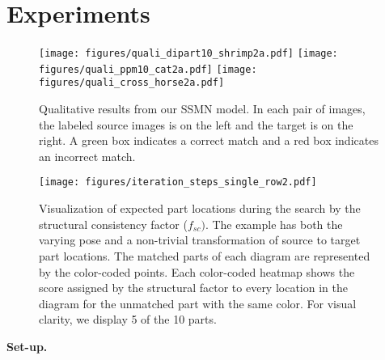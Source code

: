 \documentclass[10pt,twocolumn,letterpaper]{article}
\begin{document}
\section{Experiments}
\label{sec:exp}
\begin{figure*}[t]
    \texttt{[image: figures/quali\_dipart10\_shrimp2a.pdf]}   
    \texttt{[image: figures/quali\_ppm10\_cat2a.pdf]}
    \texttt{[image: figures/quali\_cross\_horse2a.pdf]}    
    \caption{Qualitative results from our SSMN model. In each pair of images, the labeled source images is on the left and the target is on the right. A green box indicates a correct match and a red box indicates an incorrect match.}
    \vspace{-1em}
    \label{fig:quali_result}
\end{figure*}\begin{figure*}
    \centering
    \texttt{[image: figures/iteration\_steps\_single\_row2.pdf]}
    \caption{Visualization of expected part locations during the search by the structural consistency factor ($f_{sc})$.
    The example has both the varying pose and a non-trivial transformation of source to target part locations.
    The matched parts of each diagram are represented by the color-coded points.
    Each color-coded heatmap shows the score assigned by the structural factor to every location in the diagram for the unmatched part with the same color.
    For visual clarity, we display 5 of the 10 parts.
    }
    \vspace{-1em}
    \label{fig:structural_factor}
\end{figure*}\noindent\textbf{Set-up.}
\end{document}
